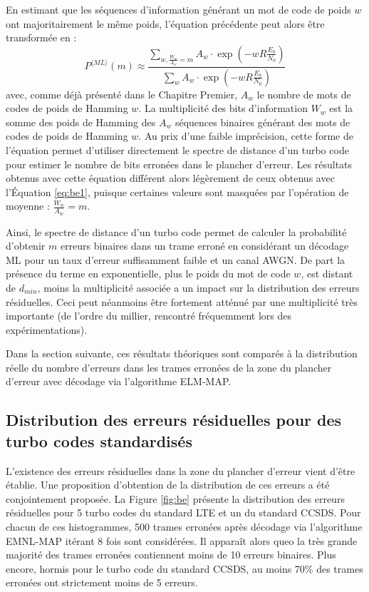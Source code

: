 En estimant que les séquences d'information 
générant un mot de code de poids $w$ ont majoritairement le même poids, l'équation précédente peut alors être transformée 
en : 
\begin{equation}
P^{\langle ML\rangle}(m) \approx \frac{\displaystyle\sum\limits_{w, \frac{W_w}{A_w}=m} A_w\cdot \exp\left(-w R \frac{E_b}{N_0}\right)}
                  {\displaystyle\sum\limits_{w} A_w\cdot \exp\left(-w R \frac{E_b}{N_0}\right)}
\label{eq:be2}
\end{equation}
avec, comme déjà présenté dans le Chapitre Premier, $A_w$ le nombre de mots de codes de poids de Hamming $w$. La 
multiplicité des bits d'information $W_w$ est la somme des poids de Hamming des $A_w$ séquences binaires générant des
mots de codes de poids de Hamming $w$. Au prix d'une faible imprécision, cette forme de l'équation permet d'utiliser 
directement le spectre de distance d'un turbo code pour estimer le nombre de bits erronées dans le plancher d'erreur. Les
résultats obtenus avec cette équation différent alors légèrement de ceux obtenus avec l'Équation \ref{eq:be1}, puisque 
certaines valeurs sont masquées par l'opération de moyenne : $\frac{W_w}{A_w}=m$. 

Ainsi, le spectre de distance d'un turbo code permet de calculer la probabilité 
d'obtenir $m$ erreurs binaires dans un trame erroné en considérant un décodage ML pour un taux d'erreur suffisamment 
faible et un canal AWGN. De part la présence du terme en exponentielle, plus le poids du mot de code $w$, est distant 
de $d_{min}$, moins la multiplicité associée a un impact sur la distribution des erreurs résiduelles. Ceci peut néanmoins
être fortement atténué par une multiplicité très importante (de l'ordre du millier, rencontré fréquemment lors des 
expérimentations).

Dans la section suivante, ces résultats théoriques sont comparés à la distribution réelle du nombre d'erreurs dans les
trames erronées de la zone du plancher d'erreur avec décodage via l'algorithme ELM-MAP.

\subsection{Distribution des erreurs résiduelles pour des turbo codes standardisés}
L'existence des erreurs résiduelles dans la zone du plancher d'erreur vient d'être établie. Une proposition d'obtention 
de la distribution de ces erreurs a été conjointement proposée. La Figure \ref{fig:be} présente la distribution des erreurs
résiduelles pour 5 turbo codes du standard LTE et un du standard CCSDS. Pour chacun de ces histogrammes, 500 trames erronées
après décodage via l'algorithme EMNL-MAP itérant 8 fois sont considérées. Il apparaît alors queo la très grande majorité 
des trames erronées contiennent moins de 10 erreurs binaires. 
Plus encore, 
hormis pour le turbo code du standard CCSDS, au moins 70\% des trames erronées ont strictement moins de 5 erreurs.

